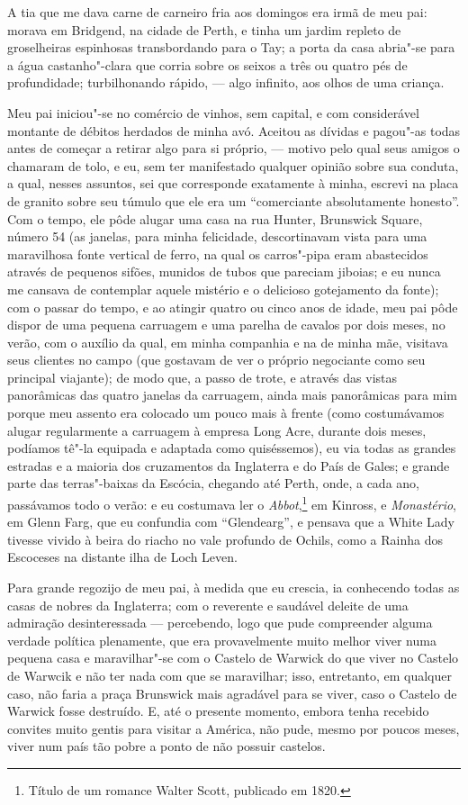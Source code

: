 A tia que me dava carne de carneiro fria aos domingos era irmã de meu
pai: morava em Bridgend, na cidade de Perth, e tinha um jardim repleto
de groselheiras espinhosas transbordando para o Tay; a porta da casa
abria"-se para a água castanho"-clara que corria sobre os seixos a três ou
quatro pés de profundidade; turbilhonando rápido, --- algo infinito, aos
olhos de uma criança.

Meu pai iniciou"-se no comércio de vinhos, sem capital, e com
considerável montante de débitos herdados de minha avó. Aceitou as
dívidas e pagou"-as todas antes de começar a retirar algo para si
próprio, --- motivo pelo qual seus amigos o chamaram de tolo, e eu, sem
ter manifestado qualquer opinião sobre sua conduta, a qual, nesses
assuntos, sei que corresponde exatamente à minha, escrevi na placa de
granito sobre seu túmulo que ele era um ``comerciante absolutamente
honesto''. Com o tempo, ele pôde alugar uma casa na rua Hunter,
Brunswick Square, número 54 (as janelas, para minha felicidade,
descortinavam vista para uma maravilhosa fonte vertical de ferro, na
qual os carros"-pipa eram abastecidos através de pequenos sifões, munidos
de tubos que pareciam jiboias; e eu nunca me cansava de contemplar
aquele mistério e o delicioso gotejamento da fonte); com o passar do
tempo, e ao atingir quatro ou cinco anos de idade, meu pai pôde dispor
de uma pequena carruagem e uma parelha de cavalos por dois meses, no
verão, com o auxílio da qual, em minha companhia e na de minha mãe,
visitava seus clientes no campo (que gostavam de ver o próprio
negociante como seu principal viajante); de modo que, a passo de trote,
e através das vistas panorâmicas das quatro janelas da carruagem, ainda
mais panorâmicas para mim porque meu assento era colocado um pouco mais
à frente (como costumávamos alugar regularmente a carruagem à empresa
Long Acre, durante dois meses, podíamos tê"-la equipada e adaptada como
quiséssemos), eu via todas as grandes estradas e a maioria dos
cruzamentos da Inglaterra e do País de Gales; e grande parte das
terras"-baixas da Escócia, chegando até Perth, onde, a cada ano,
passávamos todo o verão: e eu costumava ler o \textit{Abbot},\footnote{Título
  de um romance Walter Scott, publicado em 1820.}
em Kinross, e \textit{Monastério}, em Glenn Farg, que eu confundia com
``Glendearg'', e pensava que a White Lady tivesse vivido à beira do
riacho no vale profundo de Ochils, como a Rainha dos Escoceses na
distante ilha de Loch Leven.

Para grande regozijo de meu pai, à medida que eu crescia, ia
conhecendo todas as casas de nobres da Inglaterra; com o reverente e
saudável deleite de uma admiração desinteressada --- percebendo, logo que
pude compreender alguma verdade política plenamente, que era provavelmente
muito melhor viver numa pequena casa e maravilhar"-se com o Castelo de
Warwick do que viver no Castelo de Warwcik e não ter nada com que se
maravilhar; isso, entretanto, em qualquer caso, não faria a praça
Brunswick mais agradável para se viver, caso o Castelo de Warwick fosse
destruído. E, até o presente momento, embora tenha recebido convites
muito gentis para visitar a América, não pude, mesmo por poucos meses,
viver num país tão pobre a ponto de não possuir castelos.

